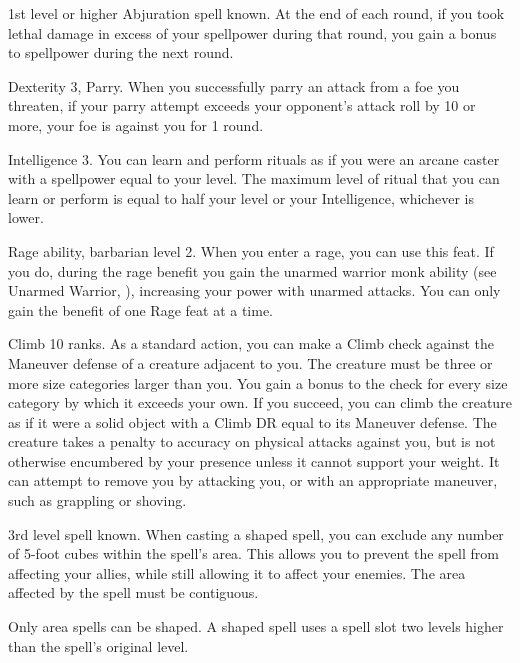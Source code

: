 \featpre 1st level or higher Abjuration spell known.
\featben At the end of each round, if you took lethal damage in excess of your spellpower during that round, you gain a  bonus to spellpower during the next round.

\featpres Dexterity 3, Parry.
\featben When you successfully parry an attack from a foe you threaten, if your parry attempt exceeds your opponent's attack roll by 10 or more, your foe is  against you for 1 round.

\featpre Intelligence 3.
\featben You can learn and perform rituals as if you were an arcane caster with a spellpower equal to your level.
The maximum level of ritual that you can learn or perform is equal to half your level or your Intelligence, whichever is lower.

\featpre Rage ability, barbarian level 2.
\featben When you enter a rage, you can use this feat. If you do, during the rage benefit you gain the unarmed warrior monk ability (see Unarmed Warrior, ), increasing your power with unarmed attacks.
 You can only gain the benefit of one Rage feat at a time.

\featpre Climb 10 ranks.
\featben As a standard action, you can make a Climb check against the Maneuver defense of a creature adjacent to you.
The creature must be three or more size categories larger than you.
You gain a  bonus to the check for every size category by which it exceeds your own.
If you succeed, you can climb the creature as if it were a solid object with a Climb DR equal to its Maneuver defense.
The creature takes a  penalty to accuracy on physical attacks against you, but is not otherwise encumbered by your presence unless it cannot support your weight.
It can attempt to remove you by attacking you, or with an appropriate maneuver, such as grappling or shoving.

\featpre 3rd level spell known.
\featben When casting a shaped spell, you can exclude any number of 5-foot cubes within the spell's area.
This allows you to prevent the spell from affecting your allies, while still allowing it to affect your enemies.
The area affected by the spell must be contiguous.

Only area spells can be shaped.
A shaped spell uses a spell slot two levels higher than the spell's original level.


